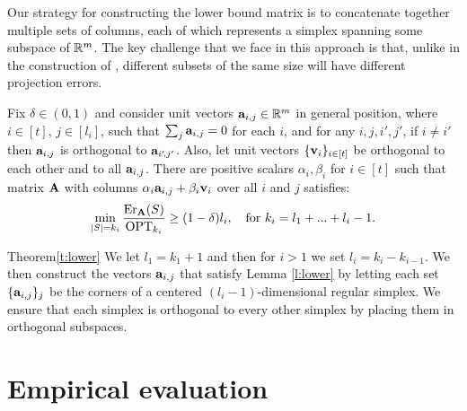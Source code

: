 \documentclass{article}
\begin{document}
Our strategy for constructing the lower bound matrix is to concatenate
together multiple sets of columns, each of which
represents a simplex spanning some subspace of $\mathbb R^m$. The key
challenge that we face in this approach is that, unlike in
the construction of \citet{pca-volume-sampling}, different subsets of
the same size will have different projection errors. 
\begin{lemma}\label{l:lower}
Fix $\delta\in(0,1)$ and consider unit vectors
$\mathbf a_{i,j}\in\mathbb R^m$ in general position, where $i\in[t]$, $j\in[l_i]$, such that
$\sum_j\mathbf a_{i,j}=0$ for each $i$, and for any $i,j,i',j'$, if $i\ne i'$
then $\mathbf a_{i,j}$ is orthogonal to $\mathbf a_{i'\!,j'}$. Also, let unit vectors
$\{\mathbf v_i\}_{i\in[t]}$ be orthogonal to  each other and to all
$\mathbf a_{i,j}$. There are positive scalars $\alpha_{i},\beta_i$ for $ i \in [t]$
such that matrix $\mathbf A$ with columns 
$\alpha_{i}\mathbf a_{i,j}+\beta_i\mathbf v_i$ over all $i$ and $j$ satisfies:
\begin{align*}
  \min_{|S|=k_i}\frac{\mathrm{Er}_\mathbf A(S)}{\mathrm{OPT}_{k_i}}\geq
  (1-\delta)l_i,\quad\text{for }k_i=l_1+...+l_i-1.
\end{align*}
\end{lemma}
\begin{proofof}{Theorem}{\ref{t:lower}}
We let $l_1 = k_1+1$ and then for $i>1$ we set $l_i=k_i-k_{i-1}$. We
then construct the vectors $\mathbf a_{i,j}$ that satisfy Lemma \ref{l:lower} 
by letting each set $\{\mathbf a_{i,j}\}_{j}$ be the corners of a centered
$(l_i-1)$-dimensional regular simplex. We ensure that each
simplex is orthogonal to every other simplex by placing them in
orthogonal subspaces. 
\end{proofof}


\section{Empirical evaluation}
\label{s:experiments}
\vspace{-2mm}
\end{document}
